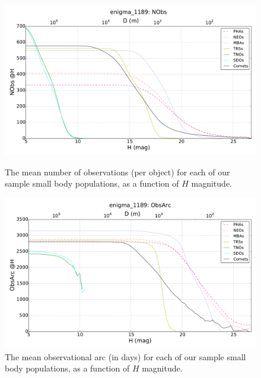 \documentclass{iau}
\begin{document}
\begin{figure}[tb]
\begin{minipage}{.5\textwidth}
\begin{center}
\includegraphics[width=0.9\linewidth]{nobs}
\captionsetup{width=0.9\linewidth}
\caption{The mean number of observations (per object) for each of our sample small
  body populations, as a function of $H$ magnitude.
\label{nobs}}
\end{center}
\end{minipage}
\begin{minipage}{.5\textwidth}
\begin{center}
\includegraphics[width=0.9\linewidth]{arclength}
\captionsetup{width=0.9\linewidth}
\caption{The mean observational arc (in days) for each of our sample
  small body populations, as a function of $H$ magnitude.
\label{arclength}}
\end{center}
\end{minipage}
\end{figure}
\end{document}

